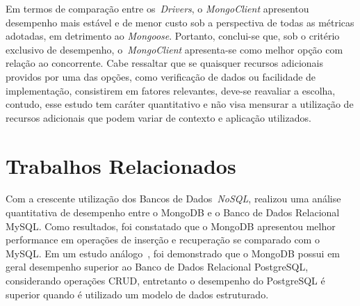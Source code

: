 \documentclass[12pt]{article}
\begin{document}
Em termos de comparação entre os~\emph{Drivers}, o \emph{MongoClient} apresentou desempenho mais estável e de menor custo sob a perspectiva de todas as métricas adotadas, em detrimento ao \emph{Mongoose}. Portanto, conclui-se que, sob o critério exclusivo de desempenho, o~\emph{MongoClient} apresenta-se como melhor opção com relação ao concorrente. Cabe ressaltar que se quaisquer recursos adicionais providos por uma das opções, como verificação de dados ou facilidade de implementação, consistirem em fatores relevantes, deve-se reavaliar a escolha, contudo, esse estudo tem caráter quantitativo e não visa mensurar a utilização de recursos adicionais que podem variar de contexto e aplicação utilizados.




\section{Trabalhos Relacionados} 
\label{section:relacionados}

Com a crescente utilização dos Bancos de Dados~\emph{NoSQL}, \cite{patil:2017} realizou uma análise quantitativa de desempenho entre o MongoDB e o Banco de Dados Relacional MySQL. Como resultados, foi constatado que o MongoDB apresentou melhor performance em operações de inserção e recuperação se comparado com o MySQL. 
Em um estudo análogo~\cite{jung:2015}, foi demonstrado que o MongoDB possui em geral desempenho superior ao Banco de Dados Relacional PostgreSQL, considerando operações CRUD, entretanto o desempenho do PostgreSQL é superior quando é utilizado um modelo de dados estruturado.
\end{document}
